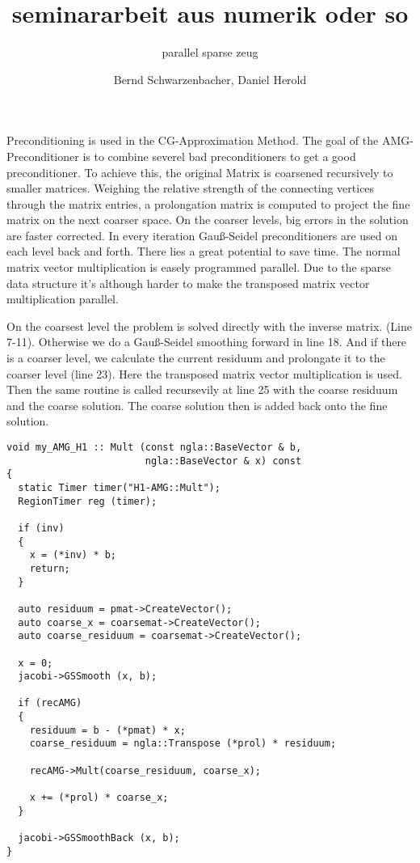 \documentclass[a4paper,11pt]{scrartcl}
\title{seminararbeit aus numerik oder so}
\subtitle{parallel sparse zeug}
\author{Bernd Schwarzenbacher, Daniel Herold}
\begin{document}
\maketitle
\tableofcontents

\pagebreak

Preconditioning is used in the CG-Approximation Method. The goal of the
AMG-Preconditioner is to combine severel bad preconditioners to
get a good preconditioner. To achieve this, the original Matrix is coarsened
recursively to smaller matrices. Weighing the relative strength of the
connecting vertices through the matrix entries, a prolongation matrix is
computed to project the fine matrix on the next coarser space. On the coarser
levels, big errors in the solution are faster corrected.
In every iteration Gauß-Seidel preconditioners are used on each level back and
forth. There lies a great potential to save time.
The normal matrix vector multiplication is easely programmed parallel. Due to
the sparse data structure it's although harder to make the transposed matrix
vector multiplication parallel.

On the coarsest level the problem is solved directly with the inverse matrix.
(Line 7-11).
Otherwise we do a Gauß-Seidel smoothing forward in line 18.
And if there is a coarser level, we calculate the current residuum and
prolongate it to the coarser level (line 23). Here the transposed
matrix vector multiplication is used. Then the same routine is called
recursevily at line 25 with the coarse residuum and the coarse solution. The
coarse solution then is added back onto the fine solution.

\begin{lstlisting}
void my_AMG_H1 :: Mult (const ngla::BaseVector & b,
                        ngla::BaseVector & x) const
{
  static Timer timer("H1-AMG::Mult");
  RegionTimer reg (timer);

  if (inv)
  {
    x = (*inv) * b;
    return;
  }

  auto residuum = pmat->CreateVector();
  auto coarse_x = coarsemat->CreateVector();
  auto coarse_residuum = coarsemat->CreateVector();

  x = 0;
  jacobi->GSSmooth (x, b);

  if (recAMG)
  {
    residuum = b - (*pmat) * x;
    coarse_residuum = ngla::Transpose (*prol) * residuum;

    recAMG->Mult(coarse_residuum, coarse_x);

    x += (*prol) * coarse_x;
  }

  jacobi->GSSmoothBack (x, b);
}
\end{lstlisting}
\end{document}
